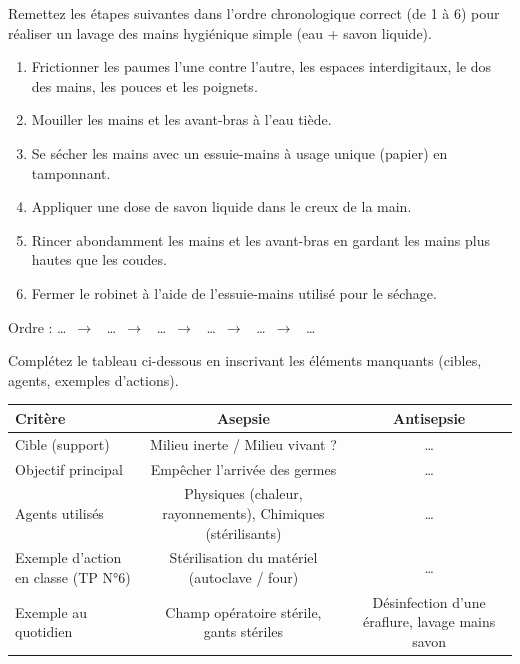 \documentclass[11pt]{article}
\begin{document}
\begin{exercice}
Remettez les étapes suivantes dans l'ordre chronologique correct (de 1 à 6) pour réaliser un lavage des mains hygiénique simple (eau + savon liquide).
\begin{enumerate}
    \item Frictionner les paumes l'une contre l'autre, les espaces interdigitaux, le dos des mains, les pouces et les poignets.
    \item Mouiller les mains et les avant-bras à l'eau tiède.
    \item Se sécher les mains avec un essuie-mains à usage unique (papier) en tamponnant.
    \item Appliquer une dose de savon liquide dans le creux de la main.
    \item Rincer abondamment les mains et les avant-bras en gardant les mains plus hautes que les coudes.
    \item Fermer le robinet à l'aide de l'essuie-mains utilisé pour le séchage.
\end{enumerate}
Ordre : \ldots \ $\rightarrow$ \ \ldots \ $\rightarrow$ \ \ldots \ $\rightarrow$ \ \ldots \ $\rightarrow$ \ \ldots \ $\rightarrow$ \ \ldots
\end{exercice}

\begin{exercice}
Complétez le tableau ci-dessous en inscrivant les éléments manquants (cibles, agents, exemples d'actions).
\begin{center}
\begin{tabular}{|l|c|c|}
\hline
\textbf{Critère} & \textbf{Asepsie} & \textbf{Antisepsie} \\
\hline
Cible (support) & Milieu inerte / Milieu vivant ? & \ldots \\
\hline
Objectif principal & Empêcher l'arrivée des germes & \ldots \\
\hline
Agents utilisés & Physiques (chaleur, rayonnements), Chimiques (stérilisants) & \ldots \\
\hline
Exemple d'action en classe (TP N°6) & Stérilisation du matériel (autoclave / four) & \ldots \\
\hline
Exemple au quotidien & Champ opératoire stérile, gants stériles & Désinfection d'une éraflure, lavage mains savon \\
\hline
\end{tabular}
\end{center}
\end{exercice}
\end{document}
